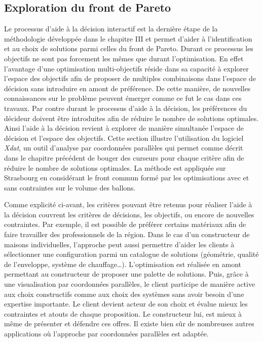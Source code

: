\subsection{Exploration du front de Pareto} %
\label{sub:exploration_du_front_de_pareto}
Le processus d’aide à la décision interactif est la dernière étape de la méthodologie
développée dans le chapitre III et permet d’aider à l’identification et au choix de
solutions parmi celles du front de Pareto. Durant ce processus les objectifs ne sont pas
forcement les mêmes que durant l’optimisation. En effet l’avantage d’une optimisation
multi-objectifs réside dans sa capacité à explorer l’espace des objectifs afin de proposer
de multiples combinaisons dans l’espace de décision sans introduire en amont de
préférence. De cette manière, de nouvelles connaissances sur le problème peuvent émerger
comme ce fut le cas dans ces travaux. Par contre durant le processus d’aide à la décision,
les préférences du décideur doivent être introduites afin de réduire le nombre de
solutions optimales. Ainsi l’aide à la décision revient à explorer de manière simultanée
l’espace de décision et l’espace des objectifs. Cette section illustre l’utilisation du
logiciel \textit{Xdat}, un outil d’analyse par coordonnées parallèles qui permet comme
décrit dans le chapitre précédent de bouger des curseurs pour chaque critère afin de
réduire le nombre de solutions optimales. La méthode est appliquée
sur Strasbourg en considérant le front commun formé par les optimisations avec et sans
contraintes sur le volume des ballons.

Comme explicité ci-avant, les critères pouvant être retenus pour réaliser l’aide à la
décision couvrent les critères de décisions, les objectifs, ou encore de nouvelles
contraintes. Par exemple, il est possible de préférer certains matériaux afin de faire
travailler des professionnels de la région. Dans le cas d’un constructeur de maisons
individuelles, l’approche peut aussi permettre d’aider les clients à sélectionner une configuration
parmi un catalogue de solutions (géométrie, qualité de l’enveloppe, système de chauffage\dots).
L’optimisation est réalisée en amont permettant au constructeur de proposer une palette de
solutions. Puis, grâce à une visualisation par coordonnées parallèles, le client participe
de manière active aux choix constructifs comme aux choix des systèmes sans avoir besoin
d’une expertise importante. Le client devient acteur de son choix et évalue mieux
les contraintes et atouts de chaque proposition. Le constructeur lui, est mieux à même de
présenter et défendre ces offres. Il existe bien sûr de nombreuses autres applications où
l’approche par coordonnées parallèles est adaptée.

